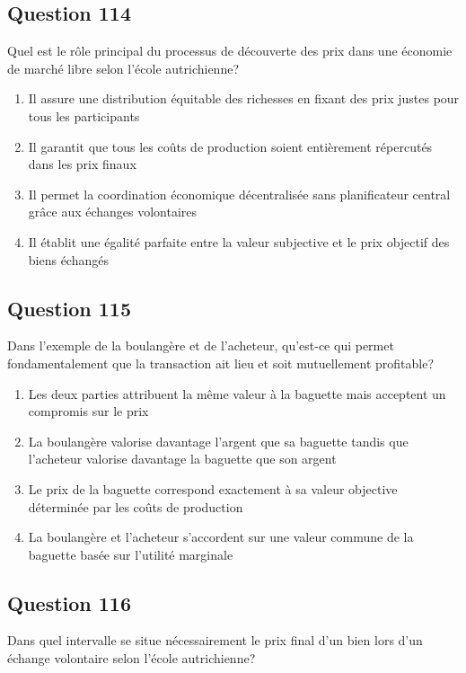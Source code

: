 \documentclass[12pt,a4paper]{article}
\begin{document}
\bigskip


\subsection*{Question 114}
Quel est le rôle principal du processus de découverte des prix dans une économie de marché libre selon l'école autrichienne?

\begin{enumerate}[label=\Alph*., leftmargin=*]
\item Il assure une distribution équitable des richesses en fixant des prix justes pour tous les participants
\item Il garantit que tous les coûts de production soient entièrement répercutés dans les prix finaux
\item Il permet la coordination économique décentralisée sans planificateur central grâce aux échanges volontaires
\item Il établit une égalité parfaite entre la valeur subjective et le prix objectif des biens échangés
\end{enumerate}

\bigskip


\subsection*{Question 115}
Dans l'exemple de la boulangère et de l'acheteur, qu'est-ce qui permet fondamentalement que la transaction ait lieu et soit mutuellement profitable?

\begin{enumerate}[label=\Alph*., leftmargin=*]
\item Les deux parties attribuent la même valeur à la baguette mais acceptent un compromis sur le prix
\item La boulangère valorise davantage l'argent que sa baguette tandis que l'acheteur valorise davantage la baguette que son argent
\item Le prix de la baguette correspond exactement à sa valeur objective déterminée par les coûts de production
\item La boulangère et l'acheteur s'accordent sur une valeur commune de la baguette basée sur l'utilité marginale
\end{enumerate}

\bigskip


\subsection*{Question 116}
Dans quel intervalle se situe nécessairement le prix final d'un bien lors d'un échange volontaire selon l'école autrichienne?
\end{document}
